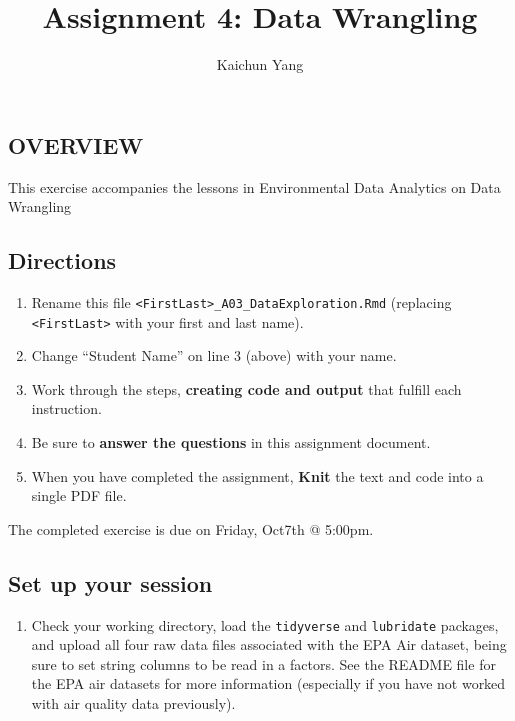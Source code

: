 \documentclass[
]{article}
\title{Assignment 4: Data Wrangling}
\author{Kaichun Yang}
\date{}
\providecommand{\tightlist}{%
  \setlength{\itemsep}{0pt}\setlength{\parskip}{0pt}}
\begin{document}
\maketitle

\hypertarget{overview}{%
\subsection{OVERVIEW}\label{overview}}

This exercise accompanies the lessons in Environmental Data Analytics on
Data Wrangling

\hypertarget{directions}{%
\subsection{Directions}\label{directions}}

\begin{enumerate}
\def\labelenumi{\arabic{enumi}.}
\tightlist
\item
  Rename this file
  \texttt{\textless{}FirstLast\textgreater{}\_A03\_DataExploration.Rmd}
  (replacing \texttt{\textless{}FirstLast\textgreater{}} with your first
  and last name).
\item
  Change ``Student Name'' on line 3 (above) with your name.
\item
  Work through the steps, \textbf{creating code and output} that fulfill
  each instruction.
\item
  Be sure to \textbf{answer the questions} in this assignment document.
\item
  When you have completed the assignment, \textbf{Knit} the text and
  code into a single PDF file.
\end{enumerate}

The completed exercise is due on Friday, Oct7th @ 5:00pm.

\hypertarget{set-up-your-session}{%
\subsection{Set up your session}\label{set-up-your-session}}

\begin{enumerate}
\def\labelenumi{\arabic{enumi}.}
\tightlist
\item
  Check your working directory, load the \texttt{tidyverse} and
  \texttt{lubridate} packages, and upload all four raw data files
  associated with the EPA Air dataset, being sure to set string columns
  to be read in a factors. See the README file for the EPA air datasets
  for more information (especially if you have not worked with air
  quality data previously).
\end{enumerate}
\end{document}
